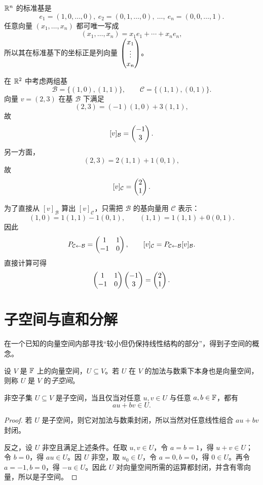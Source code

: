 \begin{example}[标准基与坐标]
$\mathbb{R}^n$ 的标准基是
\[
e_1=(1,0,\dots,0),\ e_2=(0,1,\dots,0),\ \dots,\ e_n=(0,0,\dots,1).
\]
任意向量 $(x_1,\dots,x_n)$ 都可唯一写成
\[
(x_1,\dots,x_n)=x_1e_1+\cdots+x_ne_n,
\]
所以其在标准基下的坐标正是列向量 $\begin{pmatrix} x_1\\ \vdots \\ x_n \end{pmatrix}$。
\end{example}

\begin{example}[换基计算]
在 $\mathbb{R}^2$ 中考虑两组基
\[
\mathcal B=\{(1,0),(1,1)\},\qquad \mathcal C=\{(1,1),(0,1)\}.
\]
向量 $v=(2,3)$ 在基 $\mathcal B$ 下满足
\[
(2,3)=(-1)(1,0)+3(1,1),
\]
故
\[
[v]_{\mathcal B}=\begin{pmatrix} -1\\3 \end{pmatrix}.
\]
另一方面，
\[
(2,3)=2(1,1)+1(0,1),
\]
故
\[
[v]_{\mathcal C}=\begin{pmatrix} 2\\1 \end{pmatrix}.
\]

为了直接从 $[v]_{\mathcal B}$ 算出 $[v]_{\mathcal C}$，只需把 $\mathcal B$ 的基向量用 $\mathcal C$ 表示：
\[
(1,0)=1(1,1)-1(0,1),\qquad (1,1)=1(1,1)+0(0,1).
\]
因此
\[
P_{\mathcal C\leftarrow \mathcal B}=\begin{pmatrix} 1&1\\ -1&0 \end{pmatrix},
\qquad [v]_{\mathcal C}=P_{\mathcal C\leftarrow \mathcal B}[v]_{\mathcal B}.
\]
直接计算可得
\[
\begin{pmatrix} 1&1\\ -1&0 \end{pmatrix}\begin{pmatrix} -1\\3 \end{pmatrix}=\begin{pmatrix} 2\\1 \end{pmatrix}.
\]
\end{example}

\section{子空间与直和分解}

在一个已知的向量空间内部寻找“较小但仍保持线性结构的部分”，得到子空间的概念。

\begin{definition}
设 $V$ 是 $\mathbb{F}$ 上的向量空间，$U\subseteq V$。若 $U$ 在 $V$ 的加法与数乘下本身也是向量空间，则称 $U$ 是 $V$ 的\emph{子空间}。
\end{definition}

\begin{proposition}[子空间判别法]
非空子集 $U\subseteq V$ 是子空间，当且仅当对任意 $u,v\in U$ 与任意 $a,b\in\mathbb{F}$，都有
\[
au+bv\in U.
\]
\end{proposition}

\begin{proof}
若 $U$ 是子空间，则它对加法与数乘封闭，所以当然对任意线性组合 $au+bv$ 封闭。

反之，设 $U$ 非空且满足上述条件。任取 $u,v\in U$，令 $a=b=1$，得 $u+v\in U$；令 $b=0$，得 $au\in U$。因 $U$ 非空，取 $u_0\in U$，令 $a=0,b=0$，得 $0\in U$。再令 $a=-1,b=0$，得 $-u\in U$。因此 $U$ 对向量空间所需的运算都封闭，并含有零向量，所以是子空间。
\end{proof}

